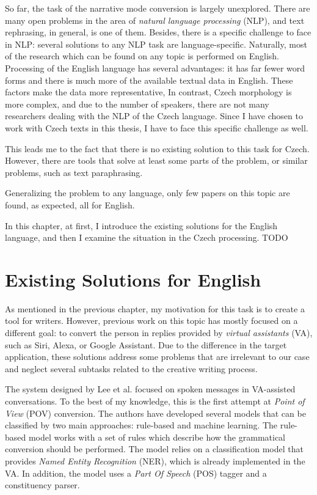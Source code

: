 So far, the task of the narrative mode conversion is largely unexplored. There are many open problems in the area of \emph{natural language processing} (NLP), and text rephrasing, in general, is one of them. Besides, there is a specific challenge to face in NLP: several solutions to any NLP task are language-specific. Naturally, most of the research which can be found on any topic is performed on English. Processing of the English language has several advantages: it has far fewer word forms and there is much more of the available textual data in English. These factors make the data more representative, In contrast, Czech morphology is more complex, and due to the number of speakers, there are not many researchers dealing with the NLP  of the Czech language. Since I have chosen to work with Czech texts in this thesis, I have to face this specific challenge as well.

This leads me to the fact that there is no existing solution to this task for Czech. However, there are tools that solve at least some parts of the problem, or similar problems, such as text paraphrasing.

Generalizing the problem to any language, only few papers on this topic are found, as expected, all for English.

In this chapter, at first, I introduce the existing solutions for the English language, and then I examine the situation in the Czech processing. TODO

\section{Existing Solutions for English}

As mentioned in the previous chapter, my motivation for this task is to create a tool for writers. However, previous work on this topic has mostly focused on a different goal: to convert the person in replies provided by \emph{virtual assistants} (VA), such as Siri, Alexa, or Google Assistant. Due to the difference in the target application, these solutions address some problems that are irrelevant to our case and neglect several subtasks related to the creative writing process.

The system designed by Lee et al. \cite{lee2020converting} focused on spoken messages in VA-assisted conversations. To the best of my knowledge, this is the first attempt at \emph{Point of View} (POV) conversion. The authors have developed several models that can be classified by two main approaches: rule-based and machine learning. The rule-based model works with a set of rules which describe how the grammatical conversion should be performed. The model relies on a classification model that provides \emph{Named Entity Recognition} (NER), which is already implemented in the VA. In addition, the model uses a \emph{Part Of Speech} (POS) tagger and a constituency parser.

